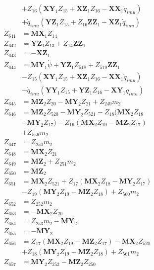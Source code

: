 \begin{multicols}{2}
\begin{align}
&+ Z_{16}(\mathbf{XY}_1Z_{15} + \mathbf{XZ}_1Z_{16} - \mathbf{XX}_1\dot{q}_{imu})  \nonumber \\
&+ \dot{q}_{imu}(\mathbf{YZ}_1Z_{15} + Z_{16}\mathbf{ZZ}_1 - \mathbf{XZ}_1\dot{q}_{imu}) \nonumber \\
Z_{641} &= \mathbf{MX}_1Z_{14} \nonumber \\
Z_{642} &= \mathbf{YZ}_1Z_{13} + Z_{14}\mathbf{ZZ}_1 \nonumber \\
Z_{643} &= -\mathbf{XZ}_1 \nonumber \\
Z_{644} &= \mathbf{MY}_1\dot{\psi} + \mathbf{YZ}_1Z_{518} + Z_{519}\mathbf{ZZ}_1  \nonumber \\
&- Z_{15}(\mathbf{XY}_1Z_{15} + \mathbf{XZ}_1Z_{16} - \mathbf{XX}_1\dot{q}_{imu})  \nonumber \\
&- \dot{q}_{imu}(\mathbf{YY}_1Z_{15} + \mathbf{YZ}_1Z_{16} - \mathbf{XY}_1\dot{q}_{imu}) \nonumber \\
Z_{645} &= \mathbf{MZ}_2Z_{20} - \mathbf{MY}_2Z_{21} + Z_{249}m_2 \nonumber \\
Z_{646} &= \mathbf{MZ}_2Z_{520} - \mathbf{MY}_2Z_{521} - Z_{18}(\mathbf{MX}_2Z_{18}  \nonumber \\
&- \mathbf{MY}_2Z_{17}) - Z_{19}(\mathbf{MX}_2Z_{19} - \mathbf{MZ}_2Z_{17})  \nonumber \\
&+ Z_{559}m_2 \nonumber \\
Z_{647} &= Z_{250}m_2 \nonumber \\
Z_{648} &= \mathbf{MX}_2Z_{21} \nonumber \\
Z_{649} &= \mathbf{MZ}_2 + Z_{251}m_2 \nonumber \\
Z_{650} &= \mathbf{MZ}_2 \nonumber \\
Z_{651} &= \mathbf{MX}_2Z_{521} + Z_{17}(\mathbf{MX}_2Z_{18} - \mathbf{MY}_2Z_{17})  \nonumber \\
&- Z_{19}(\mathbf{MY}_2Z_{19} - \mathbf{MZ}_2Z_{18}) + Z_{560}m_2 \nonumber \\
Z_{652} &= Z_{252}m_2 \nonumber \\
Z_{653} &= -\mathbf{MX}_2Z_{20} \nonumber \\
Z_{654} &= Z_{253}m_2 - \mathbf{MY}_2 \nonumber \\
Z_{655} &= -\mathbf{MY}_2 \nonumber \\
Z_{656} &= Z_{17}(\mathbf{MX}_2Z_{19} - \mathbf{MZ}_2Z_{17}) - \mathbf{MX}_2Z_{520}  \nonumber \\
&+ Z_{18}(\mathbf{MY}_2Z_{19} - \mathbf{MZ}_2Z_{18}) + Z_{561}m_2 \nonumber \\
Z_{657} &= \mathbf{MY}_2Z_{252} - \mathbf{MZ}_2Z_{250} \nonumber \\

\end{align}
\end{multicols}
